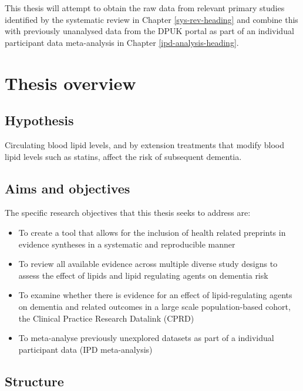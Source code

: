 \documentclass[a4paper, twoside]{templates/ociamthesis}
\providecommand{\tightlist}{%
  \setlength{\itemsep}{0pt}\setlength{\parskip}{0pt}}
\begin{document}
This thesis will attempt to obtain the raw data from relevant primary studies identified by the systematic review in Chapter \ref{sys-rev-heading} and combine this with previously unanalysed data from the DPUK portal as part of an individual participant data meta-analysis in Chapter \ref{ipd-analysis-heading}.

\hypertarget{thesis-overview}{%
\section{Thesis overview}\label{thesis-overview}}

\hypertarget{hypothesis}{%
\subsection{Hypothesis}\label{hypothesis}}

Circulating blood lipid levels, and by extension treatments that modify blood lipid levels such as statins, affect the risk of subsequent dementia.

\hypertarget{aims-and-objectives}{%
\subsection{Aims and objectives}\label{aims-and-objectives}}

The specific research objectives that this thesis seeks to address are:

\begin{itemize}
\tightlist
\item
  To create a tool that allows for the inclusion of health related preprints in evidence syntheses in a systematic and reproducible manner
\item
  To review all available evidence across multiple diverse study designs to assess the effect of lipids and lipid regulating agents on dementia risk
\item
  To examine whether there is evidence for an effect of lipid-regulating agents on dementia and related outcomes in a large scale population-based cohort, the Clinical Practice Research Datalink (CPRD)
\item
  To meta-analyse previously unexplored datasets as part of a individual participant data (IPD meta-analysis)
\end{itemize}

\hypertarget{structure}{%
\subsection{Structure}\label{structure}}
\end{document}
